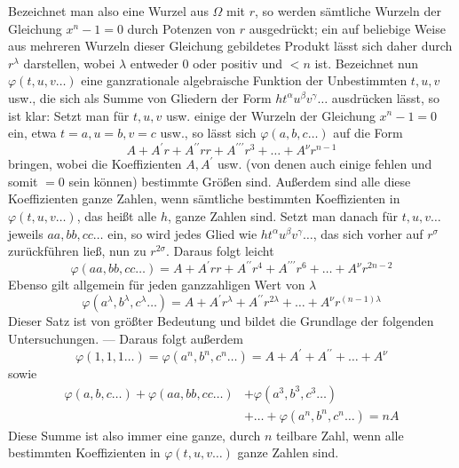 Bezeichnet man also eine Wurzel aus \(\Omega\) mit \(r\), so werden sämtliche Wurzeln der Gleichung \(x^n-1=0\) durch Potenzen von \(r\) ausgedrückt; ein auf beliebige Weise aus mehreren Wurzeln dieser Gleichung gebildetes Produkt lässt sich daher durch \(r^\lambda\) darstellen, wobei \(\lambda\) entweder \(0\) oder positiv und \(<n\) ist. Bezeichnet nun \(\varphi(t,\allowbreak u,\allowbreak v\ldots)\) eine ganzrationale algebraische Funktion der Unbestimmten \(t,\allowbreak u,\allowbreak v\) usw., die sich als Summe von Gliedern der Form \(ht^\alpha u^\beta v^\gamma\ldots\) ausdrücken lässt, so ist klar: Setzt man für \(t,\allowbreak u,\allowbreak v\) usw. einige der Wurzeln der Gleichung \(x^n-1=0\) ein, etwa \(t=a,\allowbreak u=b,\allowbreak v=c\) usw., so lässt sich \(\varphi(a,\allowbreak b,\allowbreak c\ldots)\) auf die Form \[A+A^{\prime} r+A^{\prime\prime} rr+A^{\prime\prime\prime} r^3+\ldots+A^\nu r^{n-1}\] bringen, wobei die Koeffizienten \(A,\allowbreak A^{\prime}\) usw. (von denen auch einige fehlen und somit \(=0\) sein können) bestimmte Größen sind. Außerdem sind alle diese Koeffizienten ganze Zahlen, wenn sämtliche bestimmten Koeffizienten in \(\varphi(t,\allowbreak u,\allowbreak v\ldots)\), das heißt alle
\(h\), ganze Zahlen sind. Setzt man danach für \(t,\allowbreak u,\allowbreak v\ldots\) jeweils \(aa,\allowbreak bb,\allowbreak cc\ldots\) ein, so wird jedes Glied wie \(ht^\alpha u^\beta v^\gamma\ldots\), das sich vorher auf \(r^\sigma\) zurückführen ließ, nun zu \(r^{2\sigma}\). Daraus folgt leicht \[\varphi(aa,bb,cc\ldots)=A+A^{\prime} rr+A^{\prime\prime} r^4+A^{\prime\prime\prime} r^6+\ldots+A^\nu r^{2n-2}\] Ebenso gilt allgemein für jeden ganzzahligen Wert von \(\lambda\) \[\varphi(a^\lambda,b^\lambda,c^\lambda\ldots)=A+A^{\prime} r^\lambda+A^{\prime\prime} r^{2\lambda}+\ldots+A^\nu r^{(n-1)\lambda}\] Dieser Satz ist von größter Bedeutung und bildet die Grundlage der folgenden Untersuchungen. — Daraus folgt außerdem \[\varphi(1,1,1\ldots)=\varphi(a^n,b^n,c^n\ldots)=A+A^{\prime}+A^{\prime\prime}+\ldots+A^\nu\] sowie \[\begin{aligned}
\varphi(a,b,c\ldots)+\varphi(aa,bb,cc\ldots)&+\varphi(a^3,b^3,c^3\ldots)\\
&+\ldots+\varphi(a^n,b^n,c^n\ldots)=nA
\end{aligned}\] Diese Summe ist also immer eine ganze, durch \(n\) teilbare Zahl, wenn alle bestimmten Koeffizienten in \(\varphi(t,\allowbreak u,\allowbreak v\ldots)\) ganze Zahlen sind.

